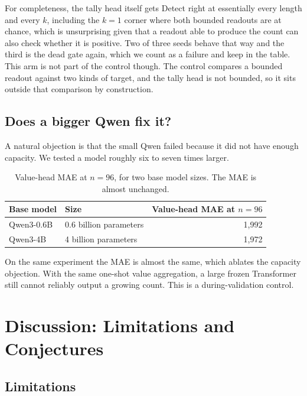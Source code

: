 \documentclass[10pt]{article}
\theoremstyle{definition}
\begin{document}
For completeness, the tally head itself gets Detect right at essentially
every length and every $k$, including the $k = 1$ corner where both bounded
readouts are at chance, which is unsurprising given that a readout able to
produce the count can also check whether it is positive. Two of three seeds
behave that way and the third is the dead gate again, which we count as a failure and keep in the table. This arm is not part of the control though. The
control compares a bounded readout against two kinds of target, and the
tally head is not bounded, so it sits outside that comparison by
construction.

\subsection{Does a bigger Qwen fix it?}
\label{sec:sizes}
\label{sec:bigger}

A natural objection is that the small Qwen failed because it did not have
enough capacity. We tested a model roughly six to seven times larger.

\begin{table}[htbp]
\centering
\caption{Value-head MAE at $n = 96$, for two base model sizes. The MAE is
almost unchanged.}
\label{tab:sizes}
\begin{tabular}{@{}llr@{}}
\toprule
\textbf{Base model} & \textbf{Size} & \textbf{Value-head MAE at $n=96$} \\
\midrule
Qwen3-0.6B & 0.6 billion parameters & 1{,}992 \\
Qwen3-4B   & 4 billion parameters   & 1{,}972 \\
\bottomrule
\end{tabular}
\end{table}

On the same experiment the MAE is almost the same, which ablates the
capacity objection. With the same one-shot value aggregation, a large
frozen Transformer still cannot reliably output a growing count. This is a
during-validation control.


\section{Discussion: Limitations and Conjectures}
\label{sec:discussion}

\subsection{Limitations}
\label{sec:limits}
\end{document}
